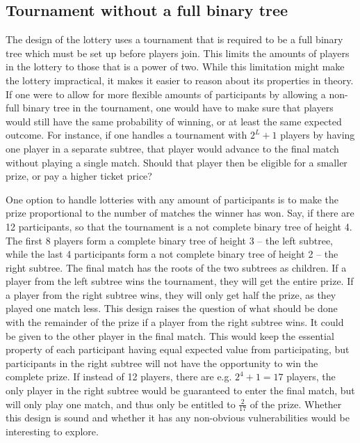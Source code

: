 \subsection{Tournament without a full binary tree}

The design of the lottery uses a tournament that is required to be a full binary tree which must be set up before players join. This limits the amounts of players in the lottery to those that is a power of two. While this limitation might make the lottery impractical, it makes it easier to reason about its properties in theory. If one were to allow for more flexible amounts of participants by allowing a non-full binary tree in the tournament, one would have to make sure that players would still have the same probability of winning, or at least the same expected outcome. For instance, if one handles a tournament with $2^L+1$ players by having one player in a separate subtree, that player would advance to the final match without playing a single match. Should that player then be eligible for a smaller prize, or pay a higher ticket price?

One option to handle lotteries with any amount of participants is to make the prize proportional to the number of matches the winner has won. Say, if there are 12 participants, so that the tournament is a not complete binary tree of height 4. The first 8 players form a complete binary tree of height 3 – the left subtree, while the last 4 participants form a not complete binary tree of height 2 – the right subtree. The final match has the roots of the two subtrees as children. If a player from the left subtree wins the tournament, they will get the entire prize. If a player from the right subtree wins, they will only get half the prize, as they played one match less. This design raises the question of what should be done with the remainder of the prize if a player from the right subtree wins. It could be given to the other player in the final match. This would keep the essential property of each participant having equal expected value from participating, but participants in the right subtree will not have the opportunity to win the complete prize. If instead of 12 players, there are e.g. $2^4+1=17$ players, the only player in the right subtree would be guaranteed to enter the final match, but will only play one match, and thus only be entitled to $\frac{2}{17}$ of the prize. 
Whether this design is sound and whether it has any non-obvious vulnerabilities would be interesting to explore.

